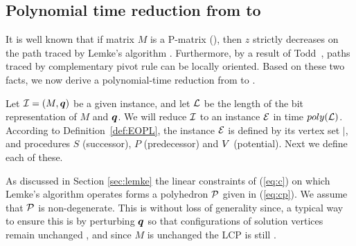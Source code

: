 
\subsection{Polynomial time reduction from \PLCP to \EOPL}

It is well known that if matrix $M$ is a P-matrix (\PLCP), then $z$ strictly
decreases on the path traced by Lemke's algorithm \cite{cottle2009linear}.
Furthermore, by a result of Todd~\cite[Section 5]{todd1976orientation}, paths traced by
complementary pivot rule can be locally oriented.  Based on these two facts, 
we now derive a polynomial-time reduction from \PLCP to \EOPL.

Let $\mbox{${\mathcal I}$}=(M,\mbox{\boldmath $q$})$ be a given \PLCP instance, and let $\mbox{${\mathcal L}$}$ be the length of the 
bit representation of $M$ and $\mbox{\boldmath $q$}$. 
We will reduce $\mbox{${\mathcal I}$}$ to an \EOPL instance $\mbox{${\mathcal E}$}$ in time $poly(\mbox{${\mathcal L}$})$. 
According to Definition~\ref{def:EOPL}, the instance $\mbox{${\mathcal E}$}$ is defined 
by its vertex set $\vert$, and procedures $S$ (successor), $P$ (predecessor) and $\mbox{$V$}$ (potential). 
Next we define each of these. 

As discussed in Section \ref{sec:lemke} the linear constraints of (\ref{eq:c})
on which Lemke's algorithm operates forms a polyhedron $\mbox{${\mathcal P}$}$ given in
(\ref{eq:cp}). We assume that $\mbox{${\mathcal P}$}$ is non-degenerate. This is without
loss of generality since, a typical way to ensure this is by perturbing $\mbox{\boldmath $q$}$ so
that configurations of solution vertices remain unchanged
\cite{cottle2009linear}, and since $M$ is unchanged the LCP is still \PLCP. 

